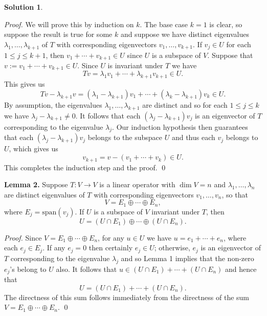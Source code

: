 \documentclass[12pt]{article}
\theoremstyle{definition}
\theoremstyle{exercise}
\theoremstyle{solution}
\newtheorem*{solution}{Solution}
\newcommand{\Span}{\text{span}}
\begin{document}
\begin{solution}
\begin{enumerate}
        \noindent \textit{Proof.} We will prove this by induction on \( k \). The base case \( k = 1 \) is clear, so suppose the result is true for some \( k \) and suppose we have distinct eigenvalues \( \lambda_1, \ldots, \lambda_{k+1} \) of \( T \) with corresponding eigenvectors \( v_1, \ldots, v_{k+1} \). If \( v_j \in U \) for each \( 1 \leq j \leq k+1 \), then \( v_1 + \cdots + v_{k+1} \in U \) since \( U \) is a subspace of \( V \). Suppose that \( v := v_1 + \cdots + v_{k+1} \in U \). Since \( U \) is invariant under \( T \) we have
        \[
            Tv = \lambda_1 v_1 + \cdots + \lambda_{k+1} v_{k+1} \in U.
        \]
        This gives us
        \[
            Tv - \lambda_{k+1}v = (\lambda_1 - \lambda_{k+1}) v_1 + \cdots + (\lambda_k - \lambda_{k+1}) v_k \in U.
        \]
        By assumption, the eigenvalues \( \lambda_1, \ldots, \lambda_{k+1} \) are distinct and so for each \( 1 \leq j \leq k \) we have \( \lambda_j - \lambda_{k+1} \neq 0 \). It follows that each \( (\lambda_j - \lambda_{k+1}) v_j \) is an eigenvector of \( T \) corresponding to the eigenvalue \( \lambda_j \). Our induction hypothesis then guarantees that each \( (\lambda_j - \lambda_{k+1}) v_j \) belongs to the subspace \( U \) and thus each \( v_j \) belongs to \( U \), which gives us
        \[
            v_{k+1} = v - (v_1 + \cdots + v_k) \in U.
        \]
        This completes the induction step and the proof. \qed

        \noindent \textbf{Lemma 2.} Suppose \( T : V \to V \) is a linear operator with \( \dim V = n \) and \( \lambda_1, \ldots, \lambda_n \) are distinct eigenvalues of \( T \) with corresponding eigenvectors \( v_1, \ldots, v_n \), so that
        \[
            V = E_1 \oplus \cdots \oplus E_n,
        \]
        where \( E_j = \Span(v_j) \). If \( U \) is a subspace of \( V \) invariant under \( T \), then
        \[
            U = (U \cap E_1) \oplus \cdots \oplus (U \cap E_n).
        \]

        \noindent \textit{Proof.} Since \( V = E_1 \oplus \cdots \oplus E_n \), for any \( u \in U \) we have \( u = e_1 + \cdots + e_n \), where each \( e_j \in E_j \). If any \( e_j = 0 \) then certainly \( e_j \in U \); otherwise, \( e_j \) is an eigenvector of \( T \) corresponding to the eigenvalue \( \lambda_j \) and so Lemma 1 implies that the non-zero \( e_j \)'s belong to \( U \) also. It follows that \( u \in (U \cap E_1) + \cdots + (U \cap E_n) \) and hence that
        \[
            U = (U \cap E_1) + \cdots + (U \cap E_n).
        \]
        The directness of this sum follows immediately from the directness of the sum \( V = E_1 \oplus \cdots \oplus E_n \). \qed


\end{enumerate}
\end{solution}
\end{document}
